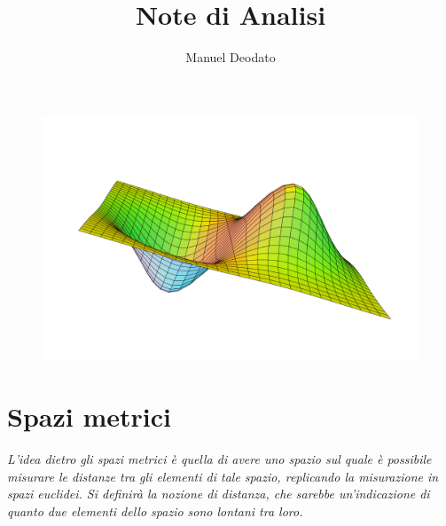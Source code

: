 \documentclass[11pt, a4paper]{scrartcl}
\title{Note di Analisi}
\author{Manuel Deodato}
\date{}
\theoremstyle{definition}
\numberwithin{esempio}{section}
\theoremstyle{definition}
\numberwithin{obs}{section}
\numberwithin{nota}{section}
\renewcommand{\maketitle}{
\begin{center}
{\sffamily
{\fontsize{20}{20}\selectfont\MakeUppercase\thetitle}}

\vspace{0.2in}

{\large\scshape\sffamily\theauthor}
\end{center}
}
\numberwithin{equation}{subsection}
\begin{document}
\maketitle
\vspace{9cm}
\begin{figure}[h!]
	\centering
	\includegraphics[width=1\columnwidth]{front.png}
\end{figure}
\newpage
\tableofcontents 
\newpage 

\section{Spazi metrici}
\begin{center}
	\textit{
L'idea dietro gli spazi metrici \`e quella di avere uno spazio sul quale \`e possibile misurare le distanze tra gli elementi di tale spazio, replicando la misurazione in spazi euclidei.
Si definir\`a la nozione di distanza, che sarebbe un'indicazione di quanto due elementi dello spazio sono lontani tra loro.}
\end{center}
\end{document}
